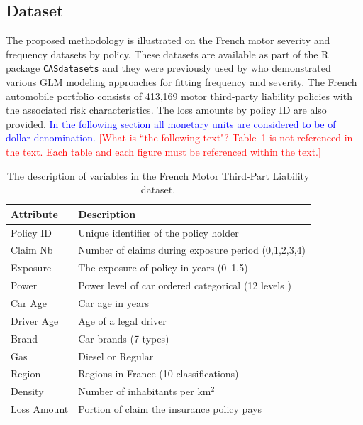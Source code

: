 \documentclass[11pt,letterpaper]{article}
\numberwithin{equation}{section}
\numberwithin{equation}{section}
\numberwithin{equation}{section}
\begin{document}
\subsection{Dataset}
The proposed methodology is illustrated on the French motor severity and frequency datasets by policy. These datasets are available as part of the {\sf R} package {\tt CASdatasets} \citep{Dutang+Charpentier:2016} and they were previously used by \cite{Charpentier:2014} who demonstrated various GLM modeling approaches for fitting frequency and severity. The French automobile portfolio consists of 413,169 motor third-party liability policies with the associated risk characteristics. The loss amounts by policy ID are also provided.  \textcolor{blue}{ In the following section all monetary units are considered to be of dollar denomination.} \textcolor{red}{[What is ``the following text"? Table~1 is not referenced in the text. Each table and each figure must be referenced within the text.]}
\begin{small}
\begin{table}[!htb]
\begin{center}
    \caption{The description of variables in the French Motor Third-Part Liability dataset.}
      \centering
        \begin{tabular}{ll}
\hline
Attribute & Description \\
\hline
Policy ID & Unique identifier of the policy holder\\
Claim Nb & Number of claims during exposure period  (0,1,2,3,4)\\
Exposure & The exposure of policy in years (0--1.5) \\
Power & Power level of car ordered categorical (12 levels )\\
Car Age & Car age in years \\
Driver Age & Age of a legal driver \\
Brand & Car brands (7 types) \\
Gas & Diesel or Regular \\
Region & Regions in France (10 classifications)\\
Density & Number of inhabitants per km$^2$ \\
Loss Amount & Portion of claim the insurance policy pays\\
\hline
		\end{tabular}
\end{center}
\end{table}
\end{small}
\end{document}
